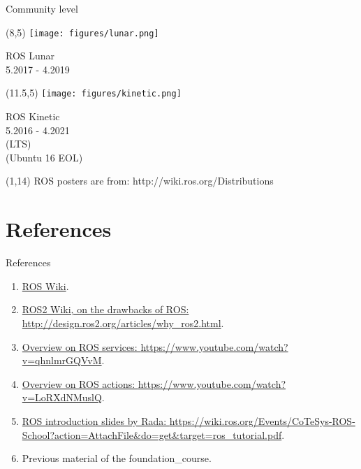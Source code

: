 \documentclass{beamer}
\begin{document}
\begin{frame}{Community level}
     \begin{textblock}{3}(8,5)
         \texttt{[image: figures/lunar.png]}
         
         \centering
         ROS Lunar\\
         \footnotesize 5.2017 - 4.2019\\
         
        
         
     \end{textblock}  
     \begin{textblock}{3}(11.5,5)
         \texttt{[image: figures/kinetic.png]}
         
         \centering
         ROS Kinetic\\
         \footnotesize  5.2016 - 4.2021\\
         (LTS)\\
         (Ubuntu 16 EOL)\\
     \end{textblock}   
 
 
\begin{textblock}{10}(1,14)
\tiny{ROS posters are from: http://wiki.ros.org/Distributions}
\end{textblock}     
     
                        
\end{frame}






\section{References}
\begin{frame}{References}

    \begin{enumerate}
        \item \href{http://wiki.ros.org/ROS/Introduction}{ROS Wiki}.
        \item \href{http://design.ros2.org/articles/why_ros2.html}{ROS2 Wiki, on the drawbacks of ROS:  \tiny{http://design.ros2.org/articles/why\_ros2.html}}.
        \item \href{https://www.youtube.com/watch?v=qhnlmrGQVvM}{Overview on ROS services: \tiny{https://www.youtube.com/watch?v=qhnlmrGQVvM}}.
        
         \item \href{https://www.youtube.com/watch?v=LoRXdNMuslQ}{Overview on ROS actions: \tiny{https://www.youtube.com/watch?v=LoRXdNMuslQ}}.   
             
        \item \href{https://wiki.ros.org/Events/CoTeSys-ROS-School?action=AttachFile&do=get&target=ros_tutorial.pdf}{ROS introduction slides by Rada: \tiny{https://wiki.ros.org/Events/CoTeSys-ROS-School?action=AttachFile\&do=get\&target=ros\_tutorial.pdf}}.
        
        \item Previous material of the foundation\_course. 
    \end{enumerate}
\end{frame}
\end{document}

